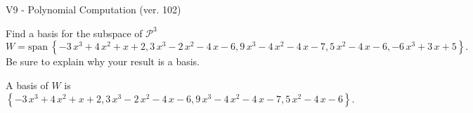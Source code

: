 \begin{exercise}
  \begin{exerciseTitle}V9 - Polynomial Computation (ver. 102)\end{exerciseTitle}
  \begin{exerciseStatement}
    Find a basis for the subspace of \(\mathcal{P}^3\) 
\[W=\mathrm{span}\ \left\{-3 \, x^{3} + 4 \, x^{2} + x + 2 , 3 \, x^{3} - 2 \, x^{2} - 4 \, x - 6 , 9 \, x^{3} - 4 \, x^{2} - 4 \, x - 7 , 5 \, x^{2} - 4 \, x - 6 , -6 \, x^{3} + 3 \, x + 5\right\}.\]
 Be sure to explain why your result is a basis.


  \end{exerciseStatement}
  \begin{exerciseAnswer}
   A basis of \(W\) is  \(\left\{-3 \, x^{3} + 4 \, x^{2} + x + 2 , 3 \, x^{3} - 2 \, x^{2} - 4 \, x - 6 , 9 \, x^{3} - 4 \, x^{2} - 4 \, x - 7 , 5 \, x^{2} - 4 \, x - 6\right\}\).
  


  \end{exerciseAnswer}
\end{exercise}
